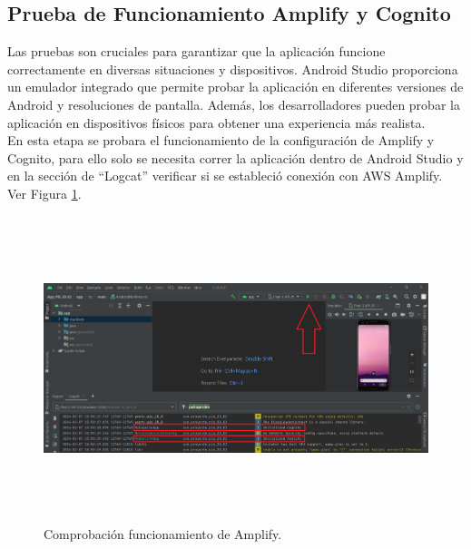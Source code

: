 \documentclass[a4paper,10pt, oneside, titlepage]{article}
\begin{document}
	\subsection{Prueba de Funcionamiento Amplify y Cognito}
	Las pruebas son cruciales para garantizar que la aplicación funcione correctamente en diversas situaciones y dispositivos. Android Studio proporciona un emulador integrado que permite probar la aplicación en diferentes versiones de Android y resoluciones de pantalla. Además, los desarrolladores pueden probar la aplicación en dispositivos físicos para obtener una experiencia más realista. \\\newline
	\indent En esta etapa se probara el funcionamiento de la configuración de Amplify y Cognito, para ello solo se necesita correr la aplicación dentro de Android Studio y en la sección de ``Logcat'' verificar si se estableció conexión con AWS Amplify. Ver Figura \ref{Comprobacion_Amplify}.
	\begin{figure}[!h]
		\centering
		\includegraphics[width = 1\linewidth, height = 8.9cm]{Comprobacion_Amplify.png}
		\caption{Comprobación funcionamiento de Amplify.}
		\label{Comprobacion_Amplify}
	\end{figure}
\end{document}
